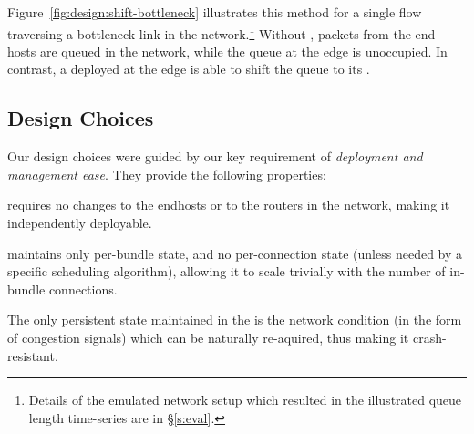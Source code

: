 Figure~\ref{fig:design:shift-bottleneck} illustrates this method for a single flow traversing a bottleneck link in the network.\footnote{Details of the emulated network setup which resulted in the illustrated queue length time-series are in \S\ref{s:eval}.} Without \name, packets from the end hosts are queued in the network, while the queue at the edge is unoccupied. In contrast, a \name deployed at the edge is able to shift the queue to its \inbox.









\subsection{Design Choices}

Our design choices were guided by our key requirement of \emph{deployment and management ease}. They provide the following properties:

 \name requires no changes to the endhosts or to the routers in the network, making it independently deployable. 

 \name maintains only per-bundle state, and no per-connection state (unless needed by a specific scheduling algorithm), allowing it to scale trivially with the number of in-bundle connections. 

 The only persistent state maintained in the \name is the network condition (in the form of congestion signals) which can be naturally re-aquired, thus making it crash-resistant. 

